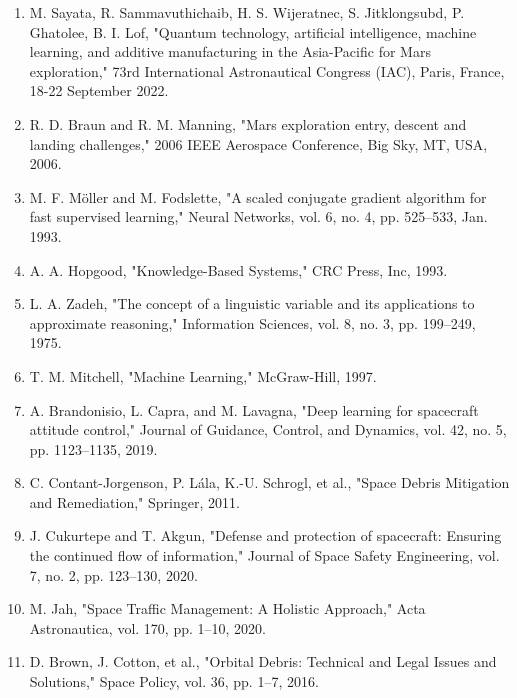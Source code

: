 \documentclass[a4paper, 11pt]{article}
\begin{document}
\begin{enumerate}
    \item M. Sayata, R. Sammavuthichaib, H. S. Wijeratnec, S. Jitklongsubd, P. Ghatolee, B. I. Lof, "Quantum technology, artificial intelligence, machine learning, and additive manufacturing in the Asia-Pacific for Mars exploration," 73rd International Astronautical Congress (IAC), Paris, France, 18-22 September 2022.

    \item R. D. Braun and R. M. Manning, "Mars exploration entry, descent and landing challenges," 2006 IEEE Aerospace Conference, Big Sky, MT, USA, 2006.

    \item M. F. Möller and M. Fodslette, "A scaled conjugate gradient algorithm for fast supervised learning," Neural Networks, vol. 6, no. 4, pp. 525–533, Jan. 1993.

    \item A. A. Hopgood, "Knowledge-Based Systems," CRC Press, Inc, 1993.

    \item L. A. Zadeh, "The concept of a linguistic variable and its applications to approximate reasoning," Information Sciences, vol. 8, no. 3, pp. 199–249, 1975.

    \item T. M. Mitchell, "Machine Learning," McGraw-Hill, 1997.

    \item A. Brandonisio, L. Capra, and M. Lavagna, "Deep learning for spacecraft attitude control," Journal of Guidance, Control, and Dynamics, vol. 42, no. 5, pp. 1123–1135, 2019.

    \item C. Contant-Jorgenson, P. Lála, K.-U. Schrogl, et al., "Space Debris Mitigation and Remediation," Springer, 2011.

    \item J. Cukurtepe and T. Akgun, "Defense and protection of spacecraft: Ensuring the continued flow of information," Journal of Space Safety Engineering, vol. 7, no. 2, pp. 123–130, 2020.

    \item M. Jah, "Space Traffic Management: A Holistic Approach," Acta Astronautica, vol. 170, pp. 1–10, 2020.

    \item D. Brown, J. Cotton, et al., "Orbital Debris: Technical and Legal Issues and Solutions," Space Policy, vol. 36, pp. 1–7, 2016.


\end{enumerate}
\end{document}
